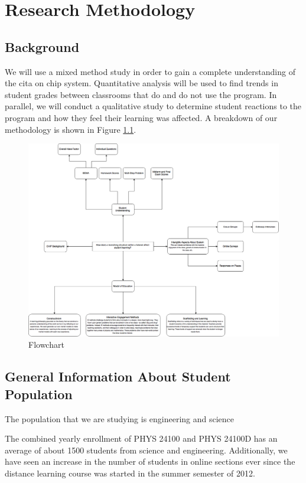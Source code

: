 \chapter[Chapter 3: Research Methodology]{Research Methodology}

\section{Background}

We will use a mixed method study in order to gain a complete understanding of the \gls{cita} on \gls{chip} system. Quantitative analysis will be used to find trends in student grades between classrooms that do and do not use the program. In parallel, we will conduct a qualitative study to determine student reactions to the program and how they feel their learning was affected. A breakdown of our methodology is shown in Figure \ref{fig:flowchart}.

\begin{figure}[!htb]
	\centering
	\includegraphics[width=6in]{img/chapter3/flowchart}
	\caption[Flowchart]{Flowchart}
  \label{fig:flowchart}
\end{figure}

\section{General Information About Student Population}

The population that we are studying is engineering and science

The combined yearly enrollment of PHYS 24100 and PHYS 24100D has an average of about 1500 students from science and engineering. Additionally, we have seen an increase in the number of students in online sections ever since the distance learning course was started in the summer semester of 2012.

